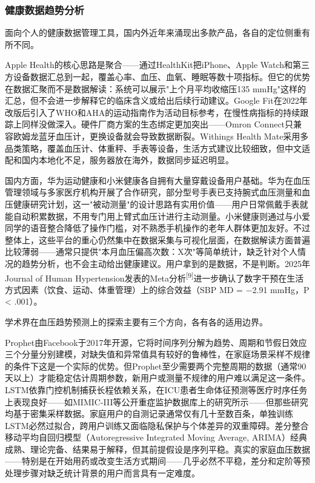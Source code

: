 \documentclass[zihao=-4,a4paper]{ctexart}
\begin{document}
\subsubsection{健康数据趋势分析}

面向个人的健康数据管理工具，国内外近年来涌现出多款产品，各自的定位侧重有所不同。

Apple Health的核心思路是聚合——通过HealthKit把iPhone、Apple Watch和第三方设备数据汇总到一起，覆盖心率、血压、血氧、睡眠等数十项指标。但它的优势在数据汇聚而不是数据解读：系统可以展示"上个月平均收缩压135 mmHg"这样的汇总，但不会进一步解释它的临床含义或给出后续行动建议。Google Fit在2022年改版后引入了WHO和AHA的运动指南作为活动目标参考，在慢性病指标的持续跟踪上同样没做深入。硬件厂商方案的生态绑定更加突出——Omron Connect只兼容欧姆龙蓝牙血压计，更换设备就会导致数据断裂。Withings Health Mate采用多品类策略，覆盖血压计、体重秤、手表等设备，生活方式建议比较细致，但中文适配和国内本地化不足，服务器放在海外，数据同步延迟明显。

国内方面，华为运动健康和小米健康各自拥有大量穿戴设备用户基础。华为在血压管理领域与多家医疗机构开展了合作研究，部分型号手表已支持腕式血压测量和血压健康研究计划，这一"被动测量"的设计思路有实用价值——用户日常佩戴手表就能自动积累数据，不用专门用上臂式血压计进行主动测量。小米健康则通过与小爱同学的语音整合降低了操作门槛，对不熟悉手机操作的老年人群体更加友好。不过整体上，这些平台的重心仍然集中在数据采集与可视化层面，在数据解读方面普遍比较薄弱——通常只提供"本月血压偏高次数：X次"等简单统计，缺乏针对个人情况的趋势分析，也不会主动给出健康建议。用户拿到的是数据，不是判断。2025年Journal of Human Hypertension发表的Meta分析\textsuperscript{[9]}进一步确认了数字干预在生活方式因素（饮食、运动、体重管理）上的综合效益（SBP MD = $-$2.91 mmHg，P < .001）。

学术界在血压趋势预测上的探索主要有三个方向，各有各的适用边界。

Prophet由Facebook于2017年开源，它将时间序列分解为趋势、周期和节假日效应三个分量分别建模，对缺失值和异常值具有较好的鲁棒性，在家庭场景采样不规律的条件下这是一个实际的优势。但Prophet至少需要两个完整周期的数据（通常90天以上）才能稳定估计周期参数，新用户或测量不规律的用户难以满足这一条件。LSTM依靠门控机制捕获长程依赖关系，在ICU患者生命体征预测等医疗时序任务上表现良好——如MIMIC-III等公开重症监护数据库上的研究所示——但那些研究均基于密集采样数据。家庭用户的自测记录通常仅有几十至数百条，单独训练LSTM必然过拟合，跨用户训练又面临隐私保护与个体差异的双重障碍。差分整合移动平均自回归模型（Autoregressive Integrated Moving Average, ARIMA）经典成熟、理论完备、结果易于解释，但其前提假设是序列平稳。真实的家庭血压数据——特别是在开始用药或改变生活方式期间——几乎必然不平稳，差分和定阶等预处理步骤对缺乏统计背景的用户而言具有一定难度。
\end{document}
